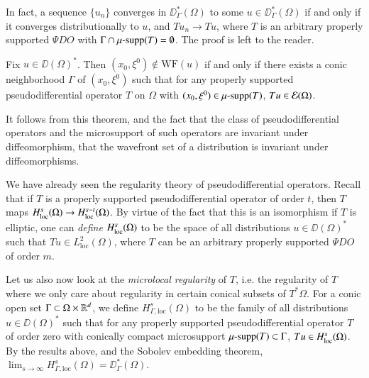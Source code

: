 In fact, a sequence $\{ u_n \}$ converges in $\DD^*_\Gamma(\Omega)$ to some $u \in \DD^*_\Gamma(\Omega)$ if and only if it converges distributionally to $u$, and $Tu_n \to Tu$, where $T$ is an arbitrary properly supported $\Psi DO$ with $\Gamma \cap \operatorname{\text{$\mu$-supp}}(T) = \emptyset$. The proof is left to the reader.

\begin{theorem}
    Fix $u \in \DD(\Omega)^*$. Then $(x_0,\xi^0) \not \in \text{WF}(u)$ if and only if there exists a conic neighborhood $\Gamma$ of $(x_0,\xi^0)$ such that for any properly supported pseudodifferential operator $T$ on $\Omega$ with $(x_0,\xi^0) \in \operatorname{\text{$\mu$-supp}}(T)$, $Tu \in \operatorname{\mathcal{E}}(\Omega)$.
\end{theorem}

\begin{remark}
    It follows from this theorem, and the fact that the class of pseudodifferential operators and the microsupport of such operators are invariant under diffeomorphism, that the wavefront set of a distribution is invariant under diffeomorphisms.
\end{remark}

We have already seen the regularity theory of pseudodifferential operators. Recall that if $T$ is a properly supported pseudodifferential operator of order $t$, then $T$ maps $H^s_{\text{loc}}(\Omega) \to H^{s-t}_{\text{loc}}(\Omega)$. By virtue of the fact that this is an isomorphism if $T$ is elliptic, one can \emph{define} $H^s_{\text{loc}}(\Omega)$ to be the space of all distributions $u \in \DD(\Omega)^*$ such that $Tu \in L^2_{\text{loc}}(\Omega)$, where $T$ can be an arbitrary properly supported $\Psi DO$ of order $m$.



Let us also now look at the \emph{microlocal regularity} of $T$, i.e. the regularity of $T$ where we only care about regularity in certain conical subsets of $T^* \Omega$. For a conic open set $\Gamma \subset \Omega \times \operatorname{\mathbb{R}}^d$, we define $H^s_{\Gamma,\text{loc}}(\Omega)$ to be the family of all distributions $u \in \DD(\Omega)^*$ such that for any properly supported pseudodifferential operator $T$ of order zero with conically compact microsupport $\operatorname{\text{$\mu$-supp}}(T) \subset \Gamma$, $Tu \in H^s_{\text{loc}}(\Omega)$. By the results above, and the Sobolev embedding theorem, $\lim_{s \to \infty} H^s_{\Gamma,\text{loc}} (\Omega) = \DD^*_\Gamma(\Omega)$.

